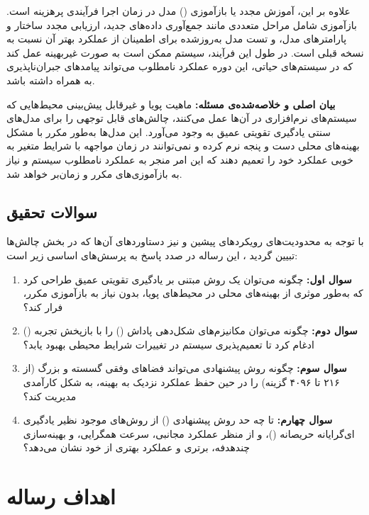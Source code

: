 \documentclass[oneside,openany,phd]{TMU-Thesis}
\begin{document}
علاوه بر این، آموزش مجدد یا بازآموزی () مدل در زمان اجرا فرآیندی پرهزینه است. بازآموزی شامل مراحل متعددی مانند جمع‌آوری داده‌های جدید، ارزیابی مجدد ساختار و پارامترهای مدل، و تست مدل به‌روزشده برای اطمینان از عملکرد بهتر آن نسبت به نسخه قبلی است. در طول این فرآیند، سیستم ممکن است به صورت غیربهینه عمل کند که در سیستم‌های حیاتی، این دوره عملکرد نامطلوب می‌تواند پیامدهای جبران‌ناپذیری به همراه داشته باشد.

\textbf{بیان اصلی و خلاصه‌شده‌ی مسئله:} ماهیت پویا و غیرقابل پیش‌بینی محیط‌هایی که سیستم‌های نرم‌افزاری در آن‌ها عمل می‌کنند، چالش‌های قابل توجهی را برای مدل‌های سنتی یادگیری تقویتی عمیق به وجود می‌آورد. این مدل‌ها به‌طور مکرر با مشکل بهینه‌های محلی دست و پنجه نرم کرده و نمی‌توانند در زمان مواجهه با شرایط متغیر به خوبی عملکرد خود را تعمیم دهند که این امر منجر به عملکرد نامطلوب سیستم و نیاز به بازآموزی‌های مکرر و زمان‌بر خواهد شد.

\subsection{سوالات تحقیق}

با توجه به محدودیت‌های رویکردهای پیشین و نیز دستاوردهای آن‌ها که در بخش چالش‌ها تبیین گردید \cite{RS_DRL_Article}، این رساله در صدد پاسخ به پرسش‌های اساسی زیر است:

\begin{enumerate}
    \item \textbf{سوال اول:} چگونه می‌توان یک روش مبتنی بر یادگیری تقویتی عمیق طراحی کرد که به‌طور موثری از بهینه‌های محلی در محیط‌های پویا، بدون نیاز به بازآموزی مکرر، فرار کند؟
    \item \textbf{سوال دوم:} چگونه می‌توان مکانیزم‌های شکل‌دهی پاداش () را با بازپخش تجربه () ادغام کرد تا تعمیم‌پذیری سیستم در تغییرات شرایط محیطی بهبود یابد؟
    \item \textbf{سوال سوم:} چگونه روش پیشنهادی می‌تواند فضاهای وفقی گسسته و بزرگ (از ۲۱۶ تا ۴۰۹۶ گزینه) را در حین حفظ عملکرد نزدیک به بهینه، به شکل کارآمدی مدیریت کند؟
    \item \textbf{سوال چهارم:} تا چه حد روش پیشنهادی () از روش‌های موجود نظیر یادگیری ای‌گرایانه حریصانه ()،  و  از منظر عملکرد مجانبی، سرعت همگرایی، و بهینه‌سازی چندهدفه، برتری و عملکرد بهتری از خود نشان می‌دهد؟
\end{enumerate}

\section{اهداف رساله}
\end{document}
